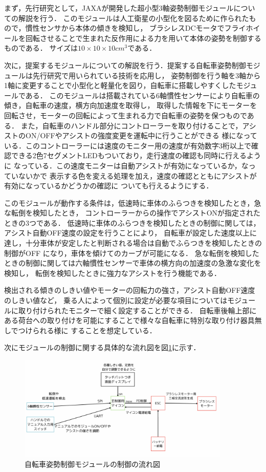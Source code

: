 \documentclass[uplatex,dvipdfmx]{jsarticle}
\begin{document}
まず，先行研究として，JAXAが開発した超小型3軸姿勢制御モジュールについての解説を行う．
このモジュールは人工衛星の小型化を図るために作られたもので，慣性センサから本体の傾きを検知し，
ブラシレスDCモータでフライホイールを回転させることで生まれた反作用による力を用いて本体の姿勢を制御するものである．
サイズは$10×10×10 {cm}^3$である\cite{jaxaModule}．

次に，提案するモジュールについての解説を行う．提案する自転車姿勢制御モジュールは先行研究で用いられている技術を応用し，
姿勢制御を行う軸を3軸から1軸に変更することで小型化と軽量化を図り，自転車に搭載しやすくしたモジュールである．
このモジュールは搭載されている6軸慣性センサーにより自転車の傾き，自転車の速度，横方向加速度を取得し，
取得した情報を下にモーターを回転させ，モーターの回転によって生まれる力で自転車の姿勢を保つものである．
また，自転車のハンドル部分にコントローラーを取り付けることで，アシストのON/OFFやアシストの強度変更を運転中に行うことができる
様になっている．このコントローラーには速度のモニター用の速度が有効数字3桁以上で確認できる2色7セグメントLEDもついており，走行速度の確認も同時に行えるように
なっている．この速度モニターは自動アシストが有効になっているか，なっていないかで
表示する色を変える処理を加え，速度の確認とともにアシストが有効になっているかどうかの確認に
ついても行えるようにする．

このモジュールが動作する条件は，低速時に車体のふらつきを検知したとき，急な転倒を検知したとき，
コントローラーからの操作でアシストONが指定されたときの3つである．
低速時に車体のふらつきを検知したときの制御に関しては，アシスト自動OFF速度の設定を行うことにより，
自転車が設定した速度以上に達し，十分車体が安定したと判断される場合は自動でふらつきを検知したときの制御がOFF
になり，車体を傾けてのカーブが可能になる．
急な転倒を検知したときの制御に関しては六軸慣性センサーで車体の横方向の加速度の急激な変化を検知し，
転倒を検知したときに強力なアシストを行う機能である．

検出される傾きのしきい値やモーターの回転力の強さ，アシスト自動OFF速度のしきい値など，
乗る人によって個別に設定が必要な項目についてはモジュールに取り付けられたモニターで細く設定することができる．
自転車後輪上部にある荷台への取り付けを可能にすることで様々な自転車に特別な取り付け器具無しでつけられる様に
することを想定している．

次にモジュールの制御に関する具体的な流れ図を図\ref{fig:nagare}に示す．
\begin{figure}[H]
    \centering
    \includegraphics[width=0.9\textwidth]{fig/nagare.png}
    \caption{自転車姿勢制御モジュールの制御の流れ図}
    \label{fig:nagare}
\end{figure}
\end{document}
